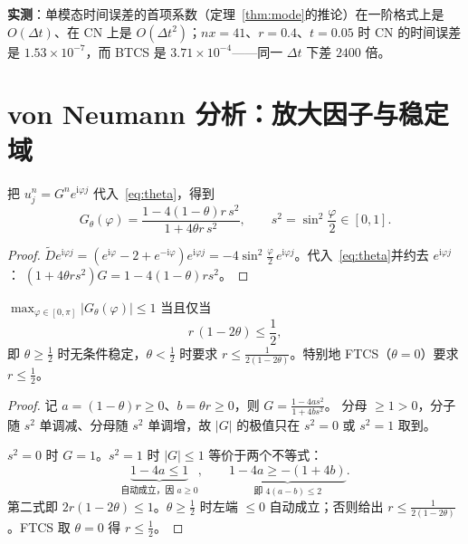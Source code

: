 \textbf{实测}：单模态时间误差的首项系数（定理~\ref{thm:mode}的推论）在一阶格式上是
$O(\Delta t)$、在 CN 上是 $O(\Delta t^2)$；$nx=41$、$r=0.4$、$t=0.05$ 时 CN 的时间误差
是 $1.53\times10^{-7}$，而 BTCS 是 $3.71\times10^{-4}$——同一 $\Delta t$ 下差 $2400$ 倍。

\section{von Neumann 分析：放大因子与稳定域}

\begin{theorem}[放大因子]
\label{thm:g}
把 $u_j^n=G^n e^{\mathrm i\varphi j}$ 代入~\eqref{eq:theta}，得到
\begin{equation}
  G_\theta(\varphi)=\frac{1-4(1-\theta)r\,s^2}{1+4\theta r\,s^2},
  \qquad s^2=\sin^2\frac\varphi2\in[0,1].
  \label{eq:G}
\end{equation}
\end{theorem}

\begin{proof}
$\tilde D e^{\mathrm i\varphi j}=(e^{\mathrm i\varphi}-2+e^{-\mathrm i\varphi})e^{\mathrm i\varphi j}
=-4\sin^2\frac\varphi2\,e^{\mathrm i\varphi j}$。代入~\eqref{eq:theta}并约去 $e^{\mathrm i\varphi j}$：
$(1+4\theta rs^2)G=1-4(1-\theta)rs^2$。
\end{proof}

\begin{theorem}[稳定判据]
\label{thm:stab}
$\max_{\varphi\in[0,\pi]}|G_\theta(\varphi)|\le1$ 当且仅当
\begin{equation}
  r\,(1-2\theta)\le\frac12 ,
\end{equation}
即 $\theta\ge\frac12$ 时无条件稳定，$\theta<\frac12$ 时要求
$r\le\frac{1}{2(1-2\theta)}$。特别地 FTCS（$\theta=0$）要求 $r\le\frac12$。
\end{theorem}

\begin{proof}
记 $a=(1-\theta)r\ge0$、$b=\theta r\ge0$，则 $G=\frac{1-4as^2}{1+4bs^2}$。
分母 $\ge1>0$，分子随 $s^2$ 单调减、分母随 $s^2$ 单调增，故 $|G|$ 的极值只在
$s^2=0$ 或 $s^2=1$ 取到。

$s^2=0$ 时 $G=1$。$s^2=1$ 时 $|G|\le1$ 等价于两个不等式：
\begin{equation}
  \underbrace{1-4a\le1}_{\text{自动成立，因 }a\ge0},
  \qquad
  \underbrace{1-4a\ge-(1+4b)}_{\text{即 }4(a-b)\le2}.
\end{equation}
第二式即 $2r(1-2\theta)\le1$。$\theta\ge\frac12$ 时左端 $\le0$ 自动成立；否则给出
$r\le\frac{1}{2(1-2\theta)}$。FTCS 取 $\theta=0$ 得 $r\le\frac12$。
\end{proof}

